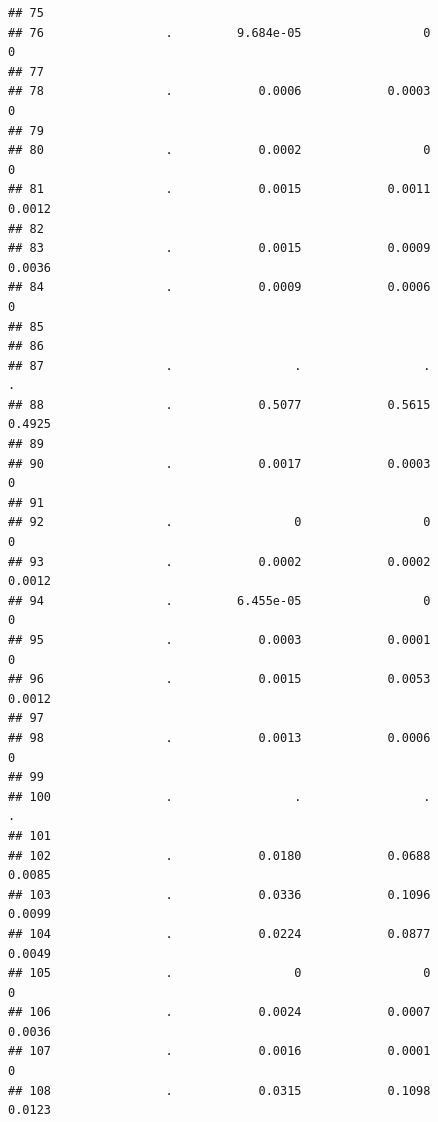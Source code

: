 \documentclass[
]{article}
\begin{document}
\begin{verbatim}
## 75                                                                        
## 76                 .         9.684e-05                 0                 0
## 77                                                                        
## 78                 .            0.0006            0.0003                 0
## 79                                                                        
## 80                 .            0.0002                 0                 0
## 81                 .            0.0015            0.0011            0.0012
## 82                                                                        
## 83                 .            0.0015            0.0009            0.0036
## 84                 .            0.0009            0.0006                 0
## 85                                                                        
## 86                                                                        
## 87                 .                 .                 .                 .
## 88                 .            0.5077            0.5615            0.4925
## 89                                                                        
## 90                 .            0.0017            0.0003                 0
## 91                                                                        
## 92                 .                 0                 0                 0
## 93                 .            0.0002            0.0002            0.0012
## 94                 .         6.455e-05                 0                 0
## 95                 .            0.0003            0.0001                 0
## 96                 .            0.0015            0.0053            0.0012
## 97                                                                        
## 98                 .            0.0013            0.0006                 0
## 99                                                                        
## 100                .                 .                 .                 .
## 101                                                                       
## 102                .            0.0180            0.0688            0.0085
## 103                .            0.0336            0.1096            0.0099
## 104                .            0.0224            0.0877            0.0049
## 105                .                 0                 0                 0
## 106                .            0.0024            0.0007            0.0036
## 107                .            0.0016            0.0001                 0
## 108                .            0.0315            0.1098            0.0123

\end{verbatim}
\end{document}
